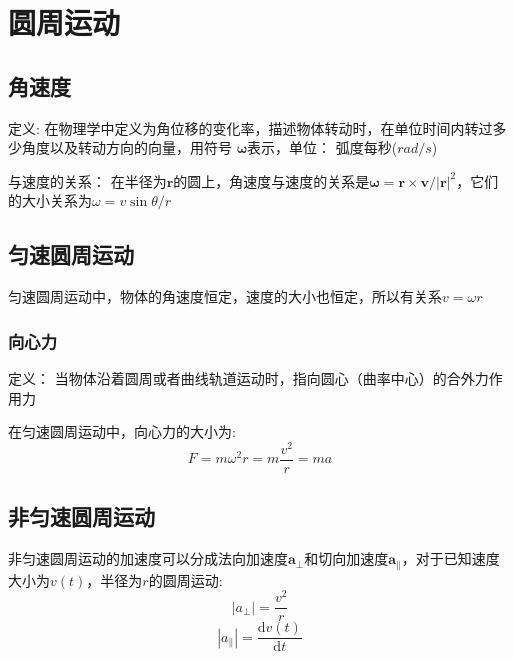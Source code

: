\documentclass[a4paper,oneside,11pt]{article}
\newcommand{\bol}[1]{\textbf{#1}}
\newcommand{\diff}{\mathrm{d}}
\begin{document}
\section{圆周运动}

\subsection{角速度}
定义: 在物理学中定义为角位移的变化率，描述物体转动时，在单位时间内转过多少角度以及转动方向的向量，用符号
$\boldsymbol{\omega}$表示，单位： 弧度每秒($rad/s$)
\par 与速度的关系： 在半径为$\bol{r}$的圆上，角速度与速度的关系是$\boldsymbol{\omega} = \bol{r}\times\bol{v}/\vert\bol{r}\vert^2$，它们的大小关系为$\omega = v\sin \theta/r$
\subsection{匀速圆周运动}
匀速圆周运动中，物体的角速度恒定，速度的大小也恒定，所以有关系$v = \omega r$
\subsubsection{向心力}
定义： 当物体沿着圆周或者曲线轨道运动时，指向圆心（曲率中心）的合外力作用力
\par 在匀速圆周运动中，向心力的大小为:
\begin{displaymath}
	F = m\omega^2r = m\frac{v^2}{r} = ma
\end{displaymath}
\subsection{非匀速圆周运动}
非匀速圆周运动的加速度可以分成法向加速度$\bol{a}_\perp$和切向加速度$\bol{a}_\parallel$，对于已知速度大小为$v(t)$，半径为$r$的圆周运动:
\begin{displaymath}
	\left\vert a_\perp\right\vert = \frac{v^2}{r}
\end{displaymath}
\begin{displaymath}
	\left\vert a_\parallel \right\vert = \frac{\diff v(t)}{\diff t}
\end{displaymath}
\end{document}
